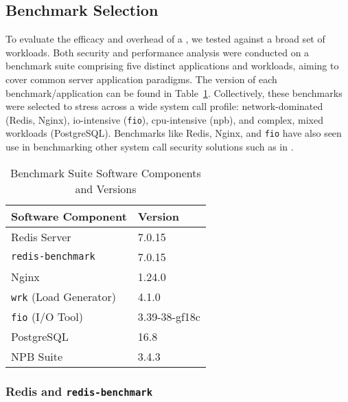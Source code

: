\subsection{Benchmark Selection}\label{subsec:benchmark-selection}

To evaluate the efficacy and overhead of a \af, we tested against a broad set
of workloads. Both security and performance analysis were conducted on a 
benchmark suite comprising five distinct applications and workloads,
aiming to cover common server application paradigms. The version of each
benchmark/application can be found in 
Table~\ref{tab:benchmark_software_versions}. Collectively, these benchmarks were
selected to stress \af across a wide system call profile: network-dominated 
(Redis, Nginx), \ac{io}-intensive (\texttt{fio}), \ac{cpu}-intensive 
(\ac{npb}), and complex, mixed workloads (PostgreSQL). Benchmarks like Redis,
Nginx, and \texttt{fio} have also seen use in benchmarking other system call
security solutions such as in \textcite{lerner2019gvisor}.

\begin{table}[h] 
    \centering 
    \caption{Benchmark Suite Software Components and Versions}
    \label{tab:benchmark_software_versions}
    \begin{tabular}{@{}ll@{}} %
        \toprule
        Software Component    & Version \\
        \midrule
        Redis Server          & 7.0.15 \\
        \texttt{redis-benchmark} & 7.0.15 \\
        Nginx                 & 1.24.0 \\
        \texttt{wrk} (Load Generator) & 4.1.0 \\ %
        \texttt{fio} (I/O Tool) & 3.39-38-gf18c \\ %
        PostgreSQL            & 16.8 \\
        NPB Suite             & 3.4.3 \\ %
        \bottomrule
    \end{tabular}
\end{table}

\subsubsection{Redis and \texttt{redis-benchmark}}\label{subsubsec:redis-just}

